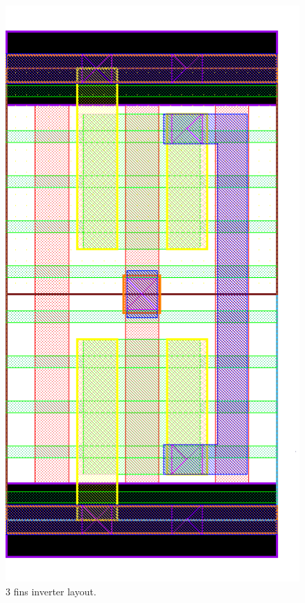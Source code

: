 \documentclass[pgmicro,mestrado,english]{iiufrgs}
\begin{document}
\begin{figure}[]
\centering
\includegraphics[width=\textwidth,height=\textheight,keepaspectratio]{INV3F.png}
\caption{3 fins inverter layout.}
\label{fig:INV3F}
\end{figure}
\end{document}
